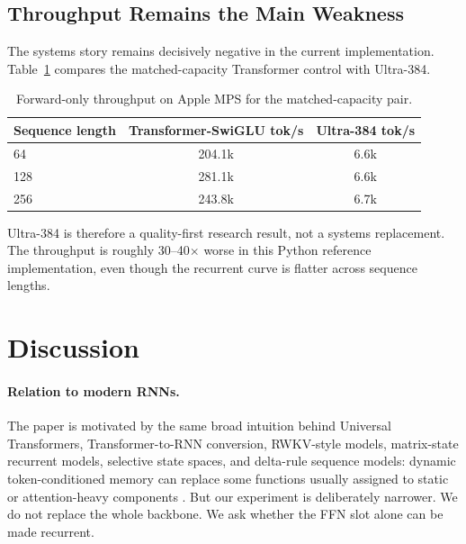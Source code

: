 \documentclass[11pt]{article}
\begin{document}
\subsection{Throughput Remains the Main Weakness}
The systems story remains decisively negative in the current implementation.
Table~\ref{tab:throughput} compares the matched-capacity Transformer control
with Ultra-384.

\begin{table}[t]
  \centering
  \caption{Forward-only throughput on Apple MPS for the matched-capacity pair.}
  \label{tab:throughput}
  \begin{tabular}{lcc}
    \toprule
    Sequence length & Transformer-SwiGLU tok/s & Ultra-384 tok/s \\
    \midrule
    64 & 204.1k & 6.6k \\
    128 & 281.1k & 6.6k \\
    256 & 243.8k & 6.7k \\
    \bottomrule
  \end{tabular}
\end{table}

Ultra-384 is therefore a quality-first research result, not a systems
replacement. The throughput is roughly 30--40$\times$ worse in this Python
reference implementation, even though the recurrent curve is flatter across
sequence lengths.

\section{Discussion}
\paragraph{Relation to modern RNNs.}
The paper is motivated by the same broad intuition behind Universal
Transformers, Transformer-to-RNN conversion, RWKV-style models, matrix-state
recurrent models, selective state spaces, and delta-rule sequence models:
dynamic token-conditioned memory can replace some functions usually assigned to
static or attention-heavy components \citep{dehghani2019universal,
kasai2021t2r, orvieto2023lru, rwkv2023, eaglefinch2024, mamba2023,
mamba2ssd2024, retnet2023, yang2024deltanet, griffin2024,
gateddeltanet2024, m2rnn2026}. But our experiment is deliberately narrower.
We do not replace the whole backbone. We ask whether the FFN slot alone can be
made recurrent.
\end{document}
